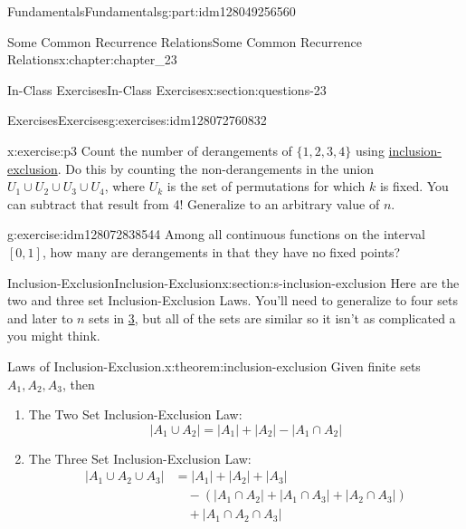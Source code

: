 \documentclass[oneside,10pt,]{book}
\numberwithin{equation}{section}
\begin{document}
\begin{partptx}{Fundamentals}{}{Fundamentals}{}{}{g:part:idm128049256560}
\begin{chapterptx}{Some Common Recurrence Relations}{}{Some Common Recurrence Relations}{}{}{x:chapter:chapter_23}
\begin{sectionptx}{In-Class Exercises}{}{In-Class Exercises}{}{}{x:section:questions-23}
\begin{exercises-subsection}{Exercises}{}{Exercises}{}{}{g:exercises:idm128072760832}
\begin{exercisegroup}
\begin{divisionexerciseeg}{3}{}{}{x:exercise:p3}
Count the number of derangements of \(\{1,2,3,4\}\) using \hyperref[x:section:s-inclusion-exclusion]{inclusion-exclusion}. Do this by counting the non-derangements in the union \(U_1 \cup U_2 \cup U_3 \cup U_4\), where \(U_k\) is the set of permutations for which \(k\) is fixed. You can subtract that result from 4!   Generalize to an arbitrary value of \(n\).%
\end{divisionexerciseeg}%
\begin{divisionexerciseeg}{4}{}{}{g:exercise:idm128072838544}%
Among all continuous functions on the interval \([0,1]\), how many are derangements in that they have no fixed points?%
\end{divisionexerciseeg}%
\end{exercisegroup}
\par\medskip\noindent
\end{exercises-subsection}
\end{sectionptx}
%
%
\typeout{************************************************}
\typeout{************************************************}
%
\begin{sectionptx}{Inclusion-Exclusion}{}{Inclusion-Exclusion}{}{}{x:section:s-inclusion-exclusion}
Here are the two and three set Inclusion-Exclusion Laws. You'll need to generalize to four sets and later to \(n\) sets in \hyperlink{x:exercise:p3}{3}, but all of the sets are similar so it isn't as complicated a you might think.%
\begin{theorem}{Laws of Inclusion-Exclusion.}{}{x:theorem:inclusion-exclusion}%
%
Given finite sets \(A_1, A_2, A_3\), then%
\begin{enumerate}[label=(\alph*)]
\item\hypertarget{x:li:ie2}{}The Two Set Inclusion-Exclusion Law:%
\begin{equation*}
\lvert A_1 \cup A_2 \rvert =\lvert A_1 \rvert + \lvert A_2 \rvert - \lvert A_1 \cap A_2 \rvert  
\end{equation*}
%
\item\hypertarget{x:li:ie3}{}The Three Set Inclusion-Exclusion Law:%
\begin{equation*}
\begin{split}
\lvert A_1 \cup A_2 \cup A_3 \rvert & =\lvert A_1 \rvert + \lvert A_2 \rvert + \lvert A_3 \rvert\\
&\quad - (\lvert A_1 \cap A_2 \rvert + \lvert A_1 \cap A_3 \rvert+ \lvert A_2 \cap A_3 \rvert)\\
&\quad + \lvert A_1 \cap A_2 \cap A_3 \rvert

\end{split}
\end{equation*}
\end{enumerate}
\end{theorem}
\end{sectionptx}
\end{chapterptx}
\end{partptx}
\end{document}
